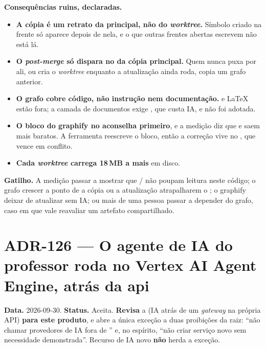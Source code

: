 \textbf{Consequências ruins, declaradas.}

\begin{itemize}
  \item \textbf{A cópia é um retrato da principal, não do \emph{worktree}.} Símbolo
    criado na frente só aparece depois de  nela, e o que outras
    frentes abertas escrevem não está lá.
  \item \textbf{O \emph{post-merge} só dispara no  da cópia principal.} Quem
    nunca puxa por ali, ou cria o \emph{worktree} enquanto a atualização ainda roda,
    copia um grafo anterior.
  \item \textbf{O grafo cobre código, não instrução nem documentação.}
     e LaTeX estão fora; a camada de documentos exige , que custa IA, e não foi adotada.
  \item \textbf{O bloco do graphify no  aconselha  primeiro}, e a
    medição diz que  e  saem mais baratos. A ferramenta reescreve o
    bloco, então a correção vive no , que vence em conflito.
  \item \textbf{Cada \emph{worktree} carrega 18\,MB a mais} em disco.
\end{itemize}

\textbf{Gatilho.} A medição passar a mostrar que / não poupam
leitura neste código; o grafo crescer a ponto de a cópia ou a atualização atrapalharem o
; o graphify deixar de atualizar sem IA; ou mais de uma pessoa passar a
depender do grafo, caso em que vale reavaliar um artefato compartilhado.

\section{ADR-126 --- O agente de IA do professor roda no Vertex AI Agent Engine, atrás da api}
\label{adr:agente-professor-engine}

\textbf{Data.} 2026-09-30. \textbf{Status.} Aceita. \textbf{Revisa} a
 (IA atrás de um \emph{gateway} na própria API) \textbf{para este
produto}, e abre a única exceção a duas proibições da raiz: \enquote{não chamar
provedores de IA fora de } e, no espírito, \enquote{não criar
serviço novo sem necessidade demonstrada}. Recurso de IA novo \textbf{não} herda a
exceção.

